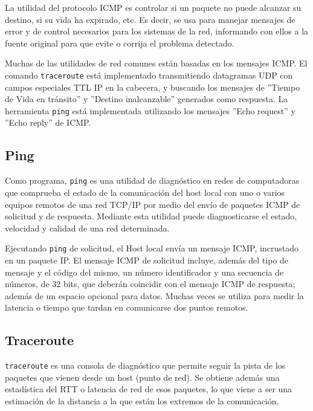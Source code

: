 \vspace*{5 mm}

La utilidad del protocolo ICMP es controlar si un paquete no puede alcanzar su destino, si su vida ha expirado, etc. Es decir, se usa para manejar mensajes de error y de control necesarios para los sistemas de la red, informando con ellos a la fuente original para que evite o corrija el problema detectado.

Muchas de las utilidades de red comunes están basadas en los mensajes ICMP. El comando \texttt{traceroute} está implementado transmitiendo datagramas UDP con campos especiales TTL IP en la cabecera, y buscando los mensajes de ''Tiempo de Vida en tránsito'' y ''Destino inalcanzable'' generados como respuesta. La herramienta \texttt{ping} está implementada utilizando los mensajes ''Echo request'' y ''Echo reply'' de ICMP.

\subsection{Ping}

Como programa, \texttt{ping} es una utilidad de diagnóstico en redes de computadoras que comprueba el estado de la comunicación del host local con uno o varios equipos remotos de una red TCP/IP por medio del envío de paquetes ICMP de solicitud y de respuesta. Mediante esta utilidad puede diagnosticarse el estado, velocidad y calidad de una red determinada.

\vspace*{5 mm}

Ejecutando \texttt{ping} de solicitud, el Host local envía un mensaje ICMP, incrustado en un paquete IP. El mensaje ICMP de solicitud incluye, además del tipo de mensaje y el código del mismo, un número identificador y una secuencia de números, de 32 bits, que deberán coincidir con el mensaje ICMP de respuesta; además de un espacio opcional para datos. Muchas veces se utiliza para medir la latencia o tiempo que tardan en comunicarse dos puntos remotos.

\subsection{Traceroute}

\texttt{traceroute} es una consola de diagnóstico que permite seguir la pista de los paquetes que vienen desde un host (punto de red). Se obtiene además una estadística del RTT o latencia de red de esos paquetes, lo que viene a ser una estimación de la distancia a la que están los extremos de la comunicación. 

